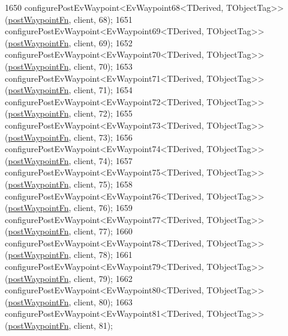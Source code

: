 \begin{DoxyCode}
1650     configurePostEvWaypoint<EvWaypoint68<TDerived, TObjectTag>>(\hyperlink{classmove__base__z__client_1_1WaypointEventDispatcher_acc538eb7506c13f7cca2268a1742dadd}{postWaypointFn}, client, 68);
1651     configurePostEvWaypoint<EvWaypoint69<TDerived, TObjectTag>>(\hyperlink{classmove__base__z__client_1_1WaypointEventDispatcher_acc538eb7506c13f7cca2268a1742dadd}{postWaypointFn}, client, 69);
1652     configurePostEvWaypoint<EvWaypoint70<TDerived, TObjectTag>>(\hyperlink{classmove__base__z__client_1_1WaypointEventDispatcher_acc538eb7506c13f7cca2268a1742dadd}{postWaypointFn}, client, 70);
1653     configurePostEvWaypoint<EvWaypoint71<TDerived, TObjectTag>>(\hyperlink{classmove__base__z__client_1_1WaypointEventDispatcher_acc538eb7506c13f7cca2268a1742dadd}{postWaypointFn}, client, 71);
1654     configurePostEvWaypoint<EvWaypoint72<TDerived, TObjectTag>>(\hyperlink{classmove__base__z__client_1_1WaypointEventDispatcher_acc538eb7506c13f7cca2268a1742dadd}{postWaypointFn}, client, 72);
1655     configurePostEvWaypoint<EvWaypoint73<TDerived, TObjectTag>>(\hyperlink{classmove__base__z__client_1_1WaypointEventDispatcher_acc538eb7506c13f7cca2268a1742dadd}{postWaypointFn}, client, 73);
1656     configurePostEvWaypoint<EvWaypoint74<TDerived, TObjectTag>>(\hyperlink{classmove__base__z__client_1_1WaypointEventDispatcher_acc538eb7506c13f7cca2268a1742dadd}{postWaypointFn}, client, 74);
1657     configurePostEvWaypoint<EvWaypoint75<TDerived, TObjectTag>>(\hyperlink{classmove__base__z__client_1_1WaypointEventDispatcher_acc538eb7506c13f7cca2268a1742dadd}{postWaypointFn}, client, 75);
1658     configurePostEvWaypoint<EvWaypoint76<TDerived, TObjectTag>>(\hyperlink{classmove__base__z__client_1_1WaypointEventDispatcher_acc538eb7506c13f7cca2268a1742dadd}{postWaypointFn}, client, 76);
1659     configurePostEvWaypoint<EvWaypoint77<TDerived, TObjectTag>>(\hyperlink{classmove__base__z__client_1_1WaypointEventDispatcher_acc538eb7506c13f7cca2268a1742dadd}{postWaypointFn}, client, 77);
1660     configurePostEvWaypoint<EvWaypoint78<TDerived, TObjectTag>>(\hyperlink{classmove__base__z__client_1_1WaypointEventDispatcher_acc538eb7506c13f7cca2268a1742dadd}{postWaypointFn}, client, 78);
1661     configurePostEvWaypoint<EvWaypoint79<TDerived, TObjectTag>>(\hyperlink{classmove__base__z__client_1_1WaypointEventDispatcher_acc538eb7506c13f7cca2268a1742dadd}{postWaypointFn}, client, 79);
1662     configurePostEvWaypoint<EvWaypoint80<TDerived, TObjectTag>>(\hyperlink{classmove__base__z__client_1_1WaypointEventDispatcher_acc538eb7506c13f7cca2268a1742dadd}{postWaypointFn}, client, 80);
1663     configurePostEvWaypoint<EvWaypoint81<TDerived, TObjectTag>>(\hyperlink{classmove__base__z__client_1_1WaypointEventDispatcher_acc538eb7506c13f7cca2268a1742dadd}{postWaypointFn}, client, 81);

\end{DoxyCode}
